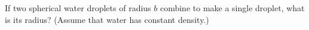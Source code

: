 If two spherical water droplets of radius $b$ combine to make a single droplet,
        what is its radius? (Assume that water has constant density.)
